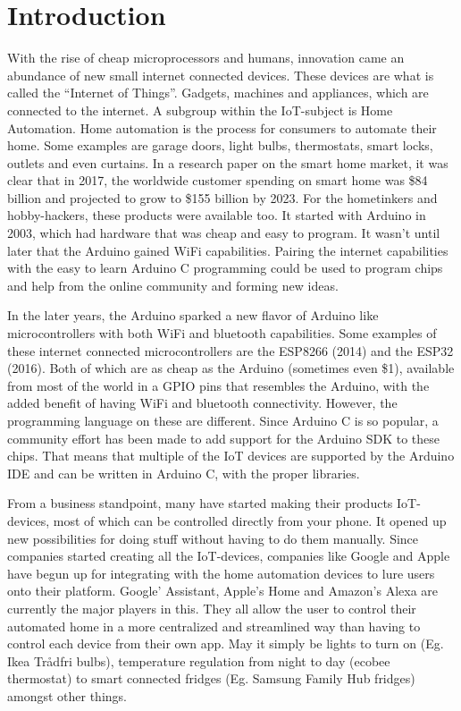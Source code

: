 \chapter{Introduction}\label{ch:introduction}
With the rise of cheap microprocessors and humans, innovation came an abundance of new small internet connected devices. These devices are what is called the “Internet of Things”. Gadgets, machines and appliances, which are connected to the internet\cite{iot-definition}. A subgroup within the IoT-subject is Home Automation. Home automation is the process for consumers to automate their home. Some examples are garage doors, light bulbs, thermostats, smart locks, outlets and even curtains. In a research paper\cite{home-auto-growth} on the smart home market, it was clear that in 2017, the worldwide customer spending on smart home was \$84 billion and projected to grow to \$155 billion by 2023. For the hometinkers and hobby-hackers, these products were available too. It started with Arduino in 2003, which had hardware that was cheap and easy to program\cite{arduino-history}. It wasn’t until later that the Arduino gained WiFi capabilities. Pairing the internet capabilities with the easy to learn Arduino C programming could be used to program chips and help from the online community and forming new ideas.

In the later years, the Arduino sparked a new flavor of Arduino like microcontrollers with both WiFi and bluetooth capabilities. Some examples of these internet connected microcontrollers are the ESP8266 (2014) and the ESP32 (2016). Both of which are as cheap as the Arduino (sometimes even \$1), available from most of the world in a GPIO pins that resembles the Arduino, with the added benefit of having WiFi and bluetooth connectivity. However, the programming language on these are different. Since Arduino C is so popular, a community effort has been made to add support for the Arduino SDK to these chips. That means that multiple of the IoT devices are supported by the Arduino IDE and can be written in Arduino C, with the proper libraries.

From a business standpoint, many have started making their products IoT-devices, most of which can be controlled directly from your phone. It opened up new possibilities for doing stuff without having to do them manually. Since companies started creating all the IoT-devices, companies like Google and Apple have begun up for integrating with the home automation devices to lure users onto their platform. Google’ Assistant\cite{google-assistant}, Apple’s Home\cite{apple-homekit} and Amazon’s Alexa\cite{amazon-alexa} are currently the major players in this. They all allow the user to control their automated home in a more centralized and streamlined way than having to control each device from their own app. May it simply be lights to turn on (Eg. Ikea Trådfri bulbs), temperature regulation from night to day (ecobee thermostat) to smart connected fridges (Eg. Samsung Family Hub fridges) amongst other things. 